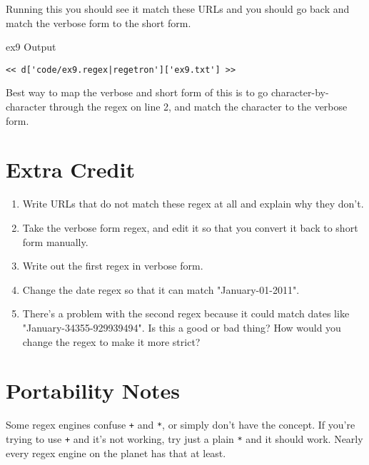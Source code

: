 Running this you should see it match these URLs and you should go back
and match the verbose form to the short form.

\begin{code}{ex9 Output}
\begin{Verbatim}
<< d['code/ex9.regex|regetron']['ex9.txt'] >>
\end{Verbatim}
\end{code}

Best way to map the verbose and short form of this is to go character-by-character
through the regex on line 2, and match the character to the verbose form.

\section{Extra Credit}

\begin{enumerate}
\item Write URLs that do not match these regex at all and explain why they don't.
\item Take the verbose form regex, and edit it so that you convert it back to
    short form manually.
\item Write out the first regex in verbose form.
\item Change the date regex so that it can match "January-01-2011".
\item There's a problem with the second regex because it could match dates like
    "January-34355-929939494".  Is this a good or bad thing?  How would you change
    the regex to make it more strict?
\end{enumerate}

\section{Portability Notes}

Some regex engines confuse \verb|+| and \verb|*|, or simply don't have 
the concept.  If you're trying to use \verb|+| and it's not working, try
just a plain \verb|*| and it should work.  Nearly every regex engine on the
planet has that at least.
